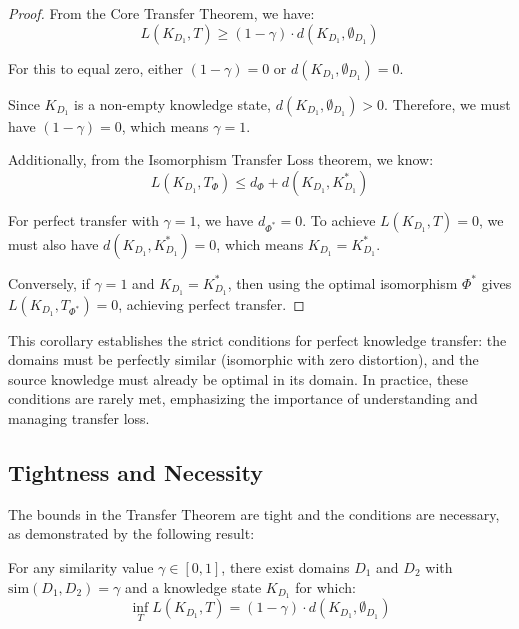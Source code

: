 \begin{proof}
From the Core Transfer Theorem, we have:
\begin{equation}
L(K_{D_1}, T) \geq (1 - \gamma) \cdot d(K_{D_1}, \emptyset_{D_1})
\end{equation}

For this to equal zero, either $(1 - \gamma) = 0$ or $d(K_{D_1}, \emptyset_{D_1}) = 0$.

Since $K_{D_1}$ is a non-empty knowledge state, $d(K_{D_1}, \emptyset_{D_1}) > 0$. Therefore, we must have $(1 - \gamma) = 0$, which means $\gamma = 1$.

Additionally, from the Isomorphism Transfer Loss theorem, we know:
\begin{equation}
L(K_{D_1}, T_{\Phi}) \leq d_{\Phi} + d(K_{D_1}, K_{D_1}^*)
\end{equation}

For perfect transfer with $\gamma = 1$, we have $d_{\Phi^*} = 0$. To achieve $L(K_{D_1}, T) = 0$, we must also have $d(K_{D_1}, K_{D_1}^*) = 0$, which means $K_{D_1} = K_{D_1}^*$.

Conversely, if $\gamma = 1$ and $K_{D_1} = K_{D_1}^*$, then using the optimal isomorphism $\Phi^*$ gives $L(K_{D_1}, T_{\Phi^*}) = 0$, achieving perfect transfer.
\end{proof}

This corollary establishes the strict conditions for perfect knowledge transfer: the domains must be perfectly similar (isomorphic with zero distortion), and the source knowledge must already be optimal in its domain. In practice, these conditions are rarely met, emphasizing the importance of understanding and managing transfer loss.

\subsection{Tightness and Necessity}

The bounds in the Transfer Theorem are tight and the conditions are necessary, as demonstrated by the following result:

\begin{theorem}
For any similarity value $\gamma \in [0,1]$, there exist domains $D_1$ and $D_2$ with $\text{sim}(D_1, D_2) = \gamma$ and a knowledge state $K_{D_1}$ for which:
\begin{equation}
\inf_{T} L(K_{D_1}, T) = (1 - \gamma) \cdot d(K_{D_1}, \emptyset_{D_1})
\end{equation}
\end{theorem}

